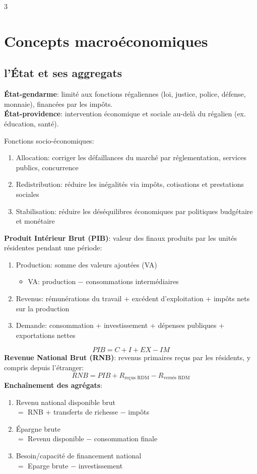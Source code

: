\documentclass[12pt, a4paper]{article}
\begin{document}
\begin{multicols*}{3}
\colbreak
\colbreak
\section{Concepts macroéconomiques}

\subsection{l'État et ses aggregats}

\textbf{État-gendarme}: limité aux fonctions régaliennes (loi, justice, police, défense, monnaie), financées par les impôts.\\
\textbf{État-providence}: intervention économique et sociale au-delà du régalien (ex. éducation, santé).

Fonctions socio-économiques:
\begin{enumerate}[\roman*.]
  \item Allocation: corriger les défaillances du marché par réglementation, services publics, concurrence
  \item Redistribution: réduire les inégalités via impôts, cotisations et prestations sociales
  \item Stabilisation: réduire les déséquilibres économiques par politiques budgétaire et monétaire
\end{enumerate}

\textbf{Produit Intérieur Brut (PIB)}: valeur des finaux produits par les unités résidentes pendant une période: 
\begin{enumerate}[\roman*.]
  \item Production: somme des valeurs ajoutées (VA)
    \begin{itemize}[topsep=.5em, leftmargin=*]
      \item VA: production $-$ consommations intermédiaires 
    \end{itemize}
  \item Revenus: rémunérations du travail + excédent d'exploitation + impôts nets sur la production
  \item Demande: consommation + investissement + dépenses publiques + exportations nettes
\end{enumerate}
\[
\boxed{PIB=C+I+EX-IM}
\]
\textbf{Revenue National Brut (RNB)}: revenus primaires reçus par les résidents, y compris depuis l'étranger:
\[
\boxed{RNB=PIB+R_{\text{reçus RDM}}-R_{\text{versés RDM}}}
\]
\textbf{Enchaînement des agrégats}:
\begin{enumerate}[\roman*.]
  \item Revenu national disponible brut\\$=$ RNB $+$ transferts de richesse $-$ impôts 
  \item Épargne brute\\$=$ Revenu disponible $-$ consommation finale
  \item Besoin/capacité de financement national\\$=$ Eparge brute $-$ investissement 
\end{enumerate}


\end{multicols*}
\end{document}
